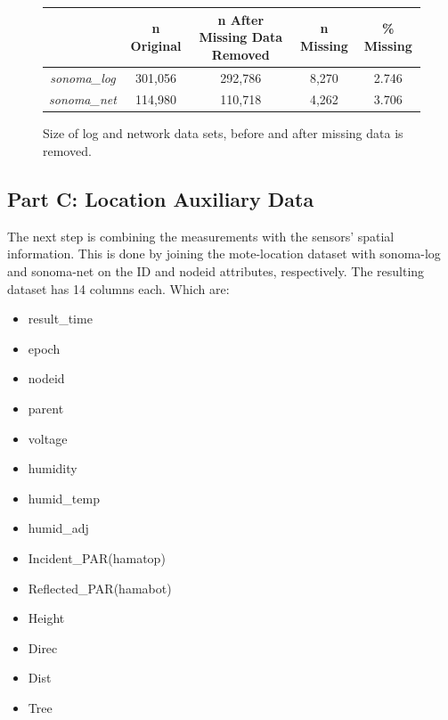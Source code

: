 \documentclass[11pt, letterpaper]{article}
\begin{document}
\begin{figure}[h!]
\centering
\begin{tabular}{ |c|c|c|c|c| } 
    \hline & n Original & n After Missing Data Removed & n Missing & \% Missing \\
    \hline
    \textit{sonoma\_log} & 301,056 & 292,786 & 8,270 &2.746\\ 
    \textit{sonoma\_net}  & 114,980 & 110,718 & 4,262 & 3.706\\
    \hline
\end{tabular}
\caption{Size of log and network data sets, before and after missing data is removed.}
\label{table:data_info}
\end{figure}

\subsection{Part C: Location Auxiliary Data}
The next step is combining the measurements with the sensors' spatial information. This is done by joining the mote-location dataset with sonoma-log and sonoma-net on the ID and nodeid attributes, respectively. The resulting dataset has 14 columns each. Which are:
    \begin{multicols}{3}
    \begin{itemize}
        \item result\_time
        \item epoch
        \item nodeid
        \item parent
        \item voltage
        \item humidity
        \item humid\_temp
        \item humid\_adj
        \item Incident\_PAR(hamatop)
        \item Reflected\_PAR(hamabot)
        \item Height
        \item Direc
        \item Dist
        \item Tree
    \end{itemize}
    \end{multicols}
\end{document}
